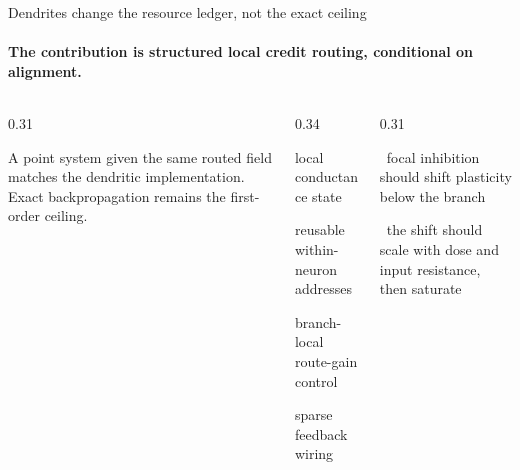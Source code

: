 \begin{frame}{Dendrites change the resource ledger, not the exact ceiling}
  \framesubtitle{The contribution is structured local credit routing, conditional on alignment.}
  \begin{columns}[T,onlytextwidth]
    \begin{column}{0.31\textwidth}
      \par
      \vspace{0.08cm}
      {\footnotesize A point system given the same routed field matches the
       dendritic implementation. Exact backpropagation remains the
       first-order ceiling.\par}
      \vspace{0.16cm}
      \centering
      \CreditTree[mode=address,K=4,scale=0.39,
          stagelabel={same routed field}]\par
    \end{column}
    \begin{column}{0.34\textwidth}
      \par
      \vspace{0.12cm}
      {\footnotesize{} local conductance state\par}
      \vspace{0.14cm}
      {\footnotesize{} reusable within-neuron addresses\par}
      \vspace{0.14cm}
      {\footnotesize{} branch-local route-gain control\par}
      \vspace{0.14cm}
      {\footnotesize{} sparse feedback wiring\par}
      \vspace{0.26cm}
    \end{column}
    \begin{column}{0.31\textwidth}
      \par
      \vspace{0.12cm}
      {\footnotesize\textbullet\ focal inhibition should shift plasticity
       below the branch\par}
      \vspace{0.14cm}
      {\footnotesize\textbullet\ the shift should scale with dose and input
       resistance, then saturate\par}

\end{column}
\end{columns}
\end{frame}
